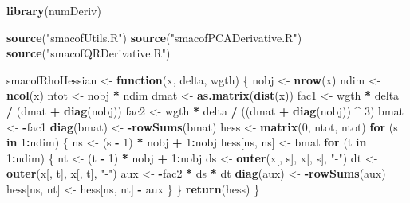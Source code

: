 \documentclass[
  12pt,
]{article}
\newenvironment{Shaded}{\begin{snugshade}}{\end{snugshade}}
\newcommand{\ControlFlowTok}[1]{\textcolor[rgb]{0.13,0.29,0.53}{\textbf{#1}}}
\newcommand{\DecValTok}[1]{\textcolor[rgb]{0.00,0.00,0.81}{#1}}
\newcommand{\FunctionTok}[1]{\textcolor[rgb]{0.13,0.29,0.53}{\textbf{#1}}}
\newcommand{\NormalTok}[1]{#1}
\newcommand{\OtherTok}[1]{\textcolor[rgb]{0.56,0.35,0.01}{#1}}
\newcommand{\SpecialCharTok}[1]{\textcolor[rgb]{0.81,0.36,0.00}{\textbf{#1}}}
\newcommand{\StringTok}[1]{\textcolor[rgb]{0.31,0.60,0.02}{#1}}
\begin{document}
\begin{Shaded}
\begin{Highlighting}[]
\FunctionTok{library}\NormalTok{(numDeriv)}

\FunctionTok{source}\NormalTok{(}\StringTok{"smacofUtils.R"}\NormalTok{)}
\FunctionTok{source}\NormalTok{(}\StringTok{"smacofPCADerivative.R"}\NormalTok{)}
\FunctionTok{source}\NormalTok{(}\StringTok{"smacofQRDerivative.R"}\NormalTok{)}

\NormalTok{smacofRhoHessian }\OtherTok{\textless{}{-}} \ControlFlowTok{function}\NormalTok{(x, delta, wgth) \{}
\NormalTok{  nobj }\OtherTok{\textless{}{-}} \FunctionTok{nrow}\NormalTok{(x)}
\NormalTok{  ndim }\OtherTok{\textless{}{-}} \FunctionTok{ncol}\NormalTok{(x)}
\NormalTok{  ntot }\OtherTok{\textless{}{-}}\NormalTok{ nobj }\SpecialCharTok{*}\NormalTok{ ndim}
\NormalTok{  dmat }\OtherTok{\textless{}{-}} \FunctionTok{as.matrix}\NormalTok{(}\FunctionTok{dist}\NormalTok{(x))}
\NormalTok{  fac1 }\OtherTok{\textless{}{-}}\NormalTok{ wgth }\SpecialCharTok{*}\NormalTok{ delta }\SpecialCharTok{/}\NormalTok{ (dmat }\SpecialCharTok{+} \FunctionTok{diag}\NormalTok{(nobj))}
\NormalTok{  fac2 }\OtherTok{\textless{}{-}}\NormalTok{ wgth }\SpecialCharTok{*}\NormalTok{ delta }\SpecialCharTok{/}\NormalTok{ ((dmat }\SpecialCharTok{+} \FunctionTok{diag}\NormalTok{(nobj)) }\SpecialCharTok{\^{}} \DecValTok{3}\NormalTok{)}
\NormalTok{  bmat }\OtherTok{\textless{}{-}} \SpecialCharTok{{-}}\NormalTok{fac1}
  \FunctionTok{diag}\NormalTok{(bmat) }\OtherTok{\textless{}{-}} \SpecialCharTok{{-}}\FunctionTok{rowSums}\NormalTok{(bmat)}
\NormalTok{  hess }\OtherTok{\textless{}{-}} \FunctionTok{matrix}\NormalTok{(}\DecValTok{0}\NormalTok{, ntot, ntot)}
  \ControlFlowTok{for}\NormalTok{ (s }\ControlFlowTok{in} \DecValTok{1}\SpecialCharTok{:}\NormalTok{ndim) \{}
\NormalTok{    ns }\OtherTok{\textless{}{-}}\NormalTok{ (s }\SpecialCharTok{{-}} \DecValTok{1}\NormalTok{) }\SpecialCharTok{*}\NormalTok{ nobj }\SpecialCharTok{+} \DecValTok{1}\SpecialCharTok{:}\NormalTok{nobj}
\NormalTok{    hess[ns, ns] }\OtherTok{\textless{}{-}}\NormalTok{ bmat}
    \ControlFlowTok{for}\NormalTok{ (t }\ControlFlowTok{in} \DecValTok{1}\SpecialCharTok{:}\NormalTok{ndim) \{}
\NormalTok{      nt }\OtherTok{\textless{}{-}}\NormalTok{ (t }\SpecialCharTok{{-}} \DecValTok{1}\NormalTok{) }\SpecialCharTok{*}\NormalTok{ nobj }\SpecialCharTok{+} \DecValTok{1}\SpecialCharTok{:}\NormalTok{nobj}
\NormalTok{      ds }\OtherTok{\textless{}{-}} \FunctionTok{outer}\NormalTok{(x[, s], x[, s], }\StringTok{"{-}"}\NormalTok{)}
\NormalTok{      dt }\OtherTok{\textless{}{-}} \FunctionTok{outer}\NormalTok{(x[, t], x[, t], }\StringTok{"{-}"}\NormalTok{)}
\NormalTok{      aux }\OtherTok{\textless{}{-}} \SpecialCharTok{{-}}\NormalTok{fac2 }\SpecialCharTok{*}\NormalTok{ ds }\SpecialCharTok{*}\NormalTok{ dt}
      \FunctionTok{diag}\NormalTok{(aux) }\OtherTok{\textless{}{-}} \SpecialCharTok{{-}}\FunctionTok{rowSums}\NormalTok{(aux)}
\NormalTok{      hess[ns, nt] }\OtherTok{\textless{}{-}}\NormalTok{ hess[ns, nt] }\SpecialCharTok{{-}}\NormalTok{ aux}
\NormalTok{    \}}
\NormalTok{  \}}
  \FunctionTok{return}\NormalTok{(hess)}
\NormalTok{\}}


\end{Highlighting}
\end{Shaded}
\end{document}
